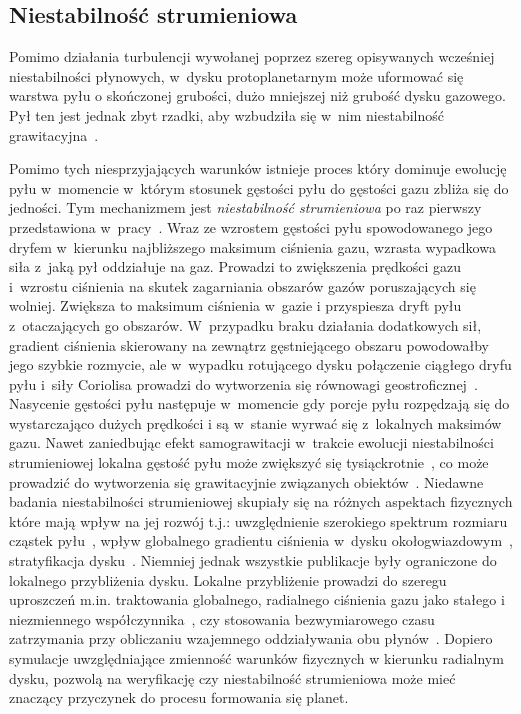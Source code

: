 \subsection{Niestabilność strumieniowa}
Pomimo działania turbulencji wywołanej poprzez szereg opisywanych wcześniej
niestabilności płynowych, w~dysku protoplanetarnym może uformować się warstwa
pyłu o skończonej grubości, dużo mniejszej niż grubość dysku gazowego. Pył ten
jest jednak zbyt rzadki, aby wzbudziła się w~nim niestabilność
grawitacyjna~\cite{JK05,JHK06}.
%
\par Pomimo tych niesprzyjających warunków istnieje proces który dominuje
ewolucję pyłu w~momencie w~którym stosunek gęstości pyłu do gęstości gazu zbliża
się do jedności. Tym mechanizmem jest {\it niestabilność strumieniowa} po raz
pierwszy przedstawiona w~pracy~\cite{YG05}.  Wraz ze wzrostem gęstości pyłu
spowodowanego jego dryfem w~kierunku najbliższego maksimum ciśnienia gazu,
wzrasta wypadkowa siła z~jaką pył oddziałuje na gaz.  Prowadzi to zwiększenia
prędkości gazu i~wzrostu ciśnienia na skutek zagarniania obszarów gazów
poruszających się wolniej. Zwiększa to maksimum ciśnienia w~gazie i przyspiesza
dryft pyłu z~otaczających go obszarów. W~przypadku braku działania dodatkowych
sił, gradient ciśnienia skierowany na zewnątrz gęstniejącego obszaru powodowałby
jego szybkie rozmycie, ale w~wypadku rotującego dysku połączenie ciągłego dryfu
pyłu i~siły Coriolisa prowadzi do wytworzenia się równowagi
geostroficznej~\cite{JBL11}. Nasycenie gęstości pyłu następuje w~momencie gdy
porcje pyłu rozpędzają się do wystarczająco dużych prędkości i są w~stanie
wyrwać się z~lokalnych maksimów gazu. Nawet zaniedbując efekt samograwitacji
w~trakcie ewolucji niestabilności strumieniowej lokalna gęstość pyłu może
zwiększyć się tysiąckrotnie~\cite{JY07}, co może prowadzić do wytworzenia się
grawitacyjnie związanych obiektów~\cite{J07}.  Niedawne badania niestabilności
strumieniowej skupiały się na różnych aspektach fizycznych które mają wpływ na
jej rozwój t.j.: uwzględnienie szerokiego spektrum rozmiaru cząstek
pyłu~\cite{BS10a}, wpływ globalnego gradientu ciśnienia w~dysku
okołogwiazdowym~\cite{BS10b}, stratyfikacja dysku~\cite{T12}.  Niemniej jednak
wszystkie publikacje były ograniczone do lokalnego przybliżenia dysku.
Lokalne przybliżenie prowadzi do szeregu uproszczeń m.in. traktowania
globalnego, radialnego ciśnienia gazu jako stałego i niezmiennego
współczynnika~\cite{N86}, czy stosowania bezwymiarowego czasu zatrzymania przy
obliczaniu wzajemnego oddziaływania obu płynów~\cite{YG05}. Dopiero symulacje
uwzględniające zmienność warunków fizycznych w kierunku radialnym dysku,
pozwolą na weryfikację czy niestabilność strumieniowa może mieć znaczący
przyczynek do procesu formowania się planet.

